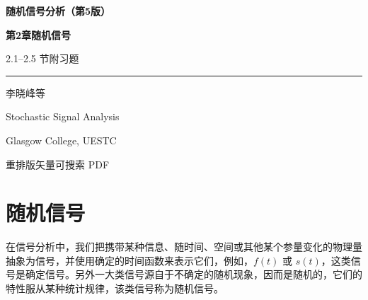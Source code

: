 \documentclass[11pt,openany,UTF8]{ctexbook}
\begin{document}
\begin{titlepage}
  \centering
  \vspace*{2.6cm}
  {\bfseries 随机信号分析（第5版\nobreak）\par}
  \vspace{1.0cm}
  {\bfseries 第2章\quad 随机信号\par}
  \vspace{0.5cm}
  { 2.1–2.5 节\quad 附\quad 习题\par}
  \vspace{1.1cm}
  \rule{0.5\textwidth}{0.6pt}\par
  \vspace{1.1cm}
  { 李晓峰\quad 等\par}
  \vfill
  { Stochastic Signal Analysis\par}
  \vspace{0.25cm}
  { Glasgow College, UESTC\par}
  \vspace{1.2cm}
  { 重排版\quad\textperiodcentered\quad 矢量可搜索 PDF\par}
  \vspace{1.6cm}
\end{titlepage}

\tableofcontents
\thispagestyle{empty}
\clearpage
\setcounter{page}{1}

\setcounter{chapter}{1}
\chapter{随机信号}


在信号分析中\nobreak，我们把携带某种信息\nobreak、随时间\nobreak、空间或其他某个参量变化的物理量抽象为信号\nobreak，并使用确定的时间函数来表示它们\nobreak，例如\nobreak，$f(t)$ 或 $s(t)$\nobreak，这类信号是确定信号\nobreak。另外一大类信号源自于不确定的随机现象\nobreak，因而是随机的\nobreak，它们的特性服从某种统计规律\nobreak，该类信号称为随机信号\nobreak。
\end{document}
